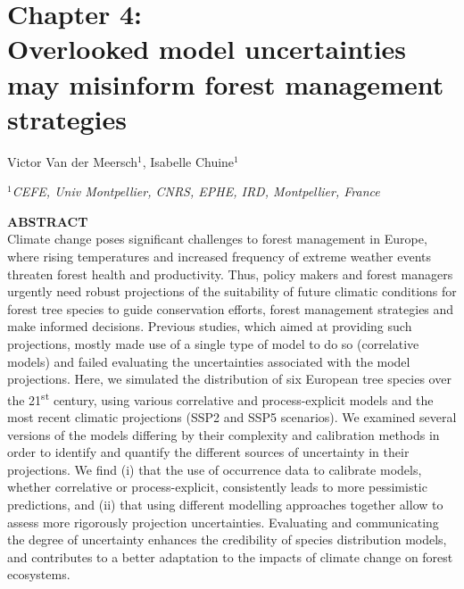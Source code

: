 \section{Chapter 4:\\ Overlooked model uncertainties may misinform forest management strategies}
\label{chapter4}

\vspace*{1cm}
\sffamily
\large
\begin{center}
Victor Van der Meersch$^1$, Isabelle Chuine$^1$

\vspace*{0.1cm}
\small
\emph{$^1$CEFE, Univ Montpellier, CNRS, EPHE, IRD, Montpellier, France}
\end{center}

\vspace*{0.7cm}
\normalsize

\vspace*{1.5cm}

\textbf{ABSTRACT}\\
Climate change poses significant challenges to forest management in Europe, where rising temperatures and increased frequency of extreme weather events threaten forest health and productivity. Thus, policy makers and forest managers urgently need robust projections of the suitability of future climatic conditions for forest tree species to guide conservation efforts, forest management strategies and make informed decisions. Previous studies, which aimed at providing such projections, mostly made use of a single type of model to do so (correlative models) and failed evaluating the uncertainties associated with the model projections. Here, we simulated the distribution of six European tree species over the 21\textsuperscript{st} century, using various correlative and process-explicit models and the most recent climatic projections (SSP2 and SSP5 scenarios). We examined several versions of the models differing by their complexity and calibration methods in order to identify and quantify the different sources of uncertainty in their projections. We find (i) that the use of occurrence data to calibrate models, whether correlative or process-explicit, consistently leads to more pessimistic predictions, and (ii) that using different modelling approaches together allow to assess more rigorously projection uncertainties. Evaluating and communicating the degree of uncertainty enhances the credibility of species distribution models, and contributes to a better adaptation to the impacts of climate change on forest ecosystems.

